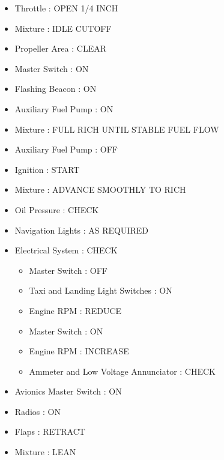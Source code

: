 \begin{itemize}
\item{} Throttle : OPEN 1\slash 4 INCH

\item{} Mixture : IDLE CUTOFF

\item{} Propeller Area : CLEAR

\item{} Master Switch : ON

\item{} Flashing Beacon : ON

\item{} Auxiliary Fuel Pump : ON

\item{} Mixture : FULL RICH UNTIL STABLE FUEL FLOW

\item{} Auxiliary Fuel Pump : OFF

\item{} Ignition : START

\item{} Mixture : ADVANCE SMOOTHLY TO RICH

\item{} Oil Pressure : CHECK

\item{} Navigation Lights : AS REQUIRED

\item{} Electrical System : CHECK

\begin{itemize}
\item{} Master Switch : OFF

\item{} Taxi and Landing Light Switches : ON

\item{} Engine RPM : REDUCE

\item{} Master Switch : ON

\item{} Engine RPM : INCREASE

\item{} Ammeter and Low Voltage Annunciator : CHECK

\end{itemize}

\item{} Avionics Master Switch : ON

\item{} Radios : ON

\item{} Flaps : RETRACT

\item{} Mixture : LEAN

\end{itemize}

